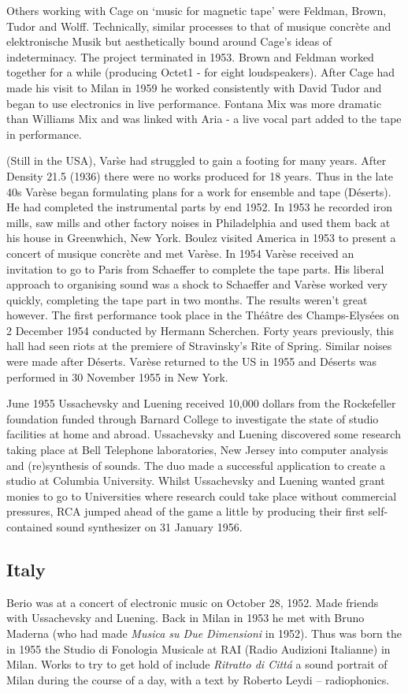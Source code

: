 Others working with Cage on `music for magnetic tape' were Feldman, Brown, Tudor and Wolff. Technically, similar processes to that of musique concr\`ete and elektronische Musik but aesthetically bound around Cage's ideas of indeterminacy. The project terminated in 1953. Brown and Feldman worked together for a while (producing Octet1 - for eight loudspeakers). After Cage had made his visit to Milan in 1959 he worked consistently with David Tudor and began to use electronics in live performance. Fontana Mix was more dramatic than Williams Mix and was linked with Aria - a live vocal part added to the tape in performance.

(Still in the USA), Var\`se had struggled to gain a footing for many years. After Density 21.5 (1936) there were no works produced for 18 years. Thus in the late 40s Var\`ese began formulating plans for a work for ensemble and tape (D\'eserts). He had completed the instrumental parts by end 1952. In 1953 he recorded iron mills, saw mills and other factory noises in Philadelphia and used them back at his house in Greenwhich, New York. Boulez visited America in 1953 to present a concert of musique concr\`ete and met Var\`ese. In 1954 Var\`ese received an invitation to go to Paris from Schaeffer to complete the tape parts. His liberal approach to organising sound was a shock to Schaeffer and Var\`ese worked very quickly, completing the tape part in two months. The results weren't great however. The first performance took place in the Th\'e\^atre des Champs-Elysées on 2 December 1954 conducted by Hermann Scherchen. Forty years previously, this hall had seen riots at the premiere of Stravinsky's Rite of Spring. Similar noises were made after D\'eserts. Var\`ese returned to the US in 1955 and D\'eserts was performed in 30 November 1955 in New York.

June 1955 Ussachevsky and Luening received 10,000 dollars from the Rockefeller foundation funded through Barnard College to investigate the state of studio facilities at home and abroad. Ussachevsky and Luening discovered some research taking place at Bell Telephone laboratories, New Jersey into computer analysis and (re)synthesis of sounds. The duo made a successful application to create a studio at Columbia University. Whilst Ussachevsky and Luening wanted grant monies to go to Universities where research could take place without commercial pressures, RCA jumped ahead of the game a little by producing their first self-contained sound synthesizer on 31 January 1956.

\subsection{Italy}
Berio was at a concert of electronic music on October 28, 1952.  Made friends with Ussachevsky and Luening.  Back in Milan in 1953 he met with Bruno Maderna (who had made \textit{Musica su Due Dimensioni} in 1952). Thus was born the in 1955 the Studio di Fonologia Musicale at RAI (Radio Audizioni Italianne) in Milan.  Works to try to get hold of include \textit{Ritratto di Citt\'a} a sound portrait of Milan during the course of a day, with a text by Roberto Leydi – radiophonics.


